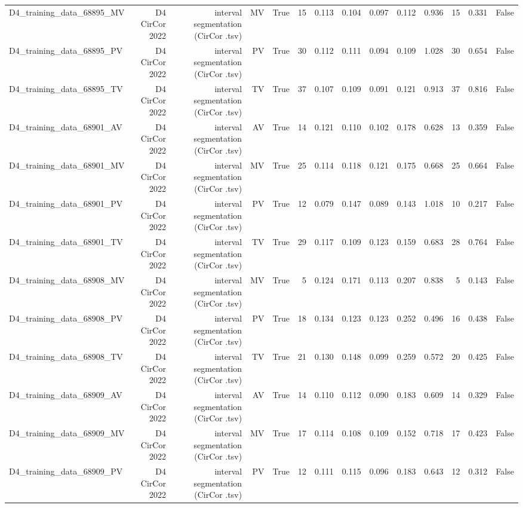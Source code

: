 \begin{table}[htbp]
\begin{tabular}{lrrrrrrrrrrrrr}
    D4\_training\_data\_68895\_MV & D4 CirCor 2022 & interval segmentation (CirCor .tsv) & MV & True & 15 & 0.113 & 0.104 & 0.097 & 0.112 & 0.936 & 15 & 0.331 & False \\
    D4\_training\_data\_68895\_PV & D4 CirCor 2022 & interval segmentation (CirCor .tsv) & PV & True & 30 & 0.112 & 0.111 & 0.094 & 0.109 & 1.028 & 30 & 0.654 & False \\
    D4\_training\_data\_68895\_TV & D4 CirCor 2022 & interval segmentation (CirCor .tsv) & TV & True & 37 & 0.107 & 0.109 & 0.091 & 0.121 & 0.913 & 37 & 0.816 & False \\
    D4\_training\_data\_68901\_AV & D4 CirCor 2022 & interval segmentation (CirCor .tsv) & AV & True & 14 & 0.121 & 0.110 & 0.102 & 0.178 & 0.628 & 13 & 0.359 & False \\
    D4\_training\_data\_68901\_MV & D4 CirCor 2022 & interval segmentation (CirCor .tsv) & MV & True & 25 & 0.114 & 0.118 & 0.121 & 0.175 & 0.668 & 25 & 0.664 & False \\
    D4\_training\_data\_68901\_PV & D4 CirCor 2022 & interval segmentation (CirCor .tsv) & PV & True & 12 & 0.079 & 0.147 & 0.089 & 0.143 & 1.018 & 10 & 0.217 & False \\
    D4\_training\_data\_68901\_TV & D4 CirCor 2022 & interval segmentation (CirCor .tsv) & TV & True & 29 & 0.117 & 0.109 & 0.123 & 0.159 & 0.683 & 28 & 0.764 & False \\
    D4\_training\_data\_68908\_MV & D4 CirCor 2022 & interval segmentation (CirCor .tsv) & MV & True & 5 & 0.124 & 0.171 & 0.113 & 0.207 & 0.838 & 5 & 0.143 & False \\
    D4\_training\_data\_68908\_PV & D4 CirCor 2022 & interval segmentation (CirCor .tsv) & PV & True & 18 & 0.134 & 0.123 & 0.123 & 0.252 & 0.496 & 16 & 0.438 & False \\
    D4\_training\_data\_68908\_TV & D4 CirCor 2022 & interval segmentation (CirCor .tsv) & TV & True & 21 & 0.130 & 0.148 & 0.099 & 0.259 & 0.572 & 20 & 0.425 & False \\
    D4\_training\_data\_68909\_AV & D4 CirCor 2022 & interval segmentation (CirCor .tsv) & AV & True & 14 & 0.110 & 0.112 & 0.090 & 0.183 & 0.609 & 14 & 0.329 & False \\
    D4\_training\_data\_68909\_MV & D4 CirCor 2022 & interval segmentation (CirCor .tsv) & MV & True & 17 & 0.114 & 0.108 & 0.109 & 0.152 & 0.718 & 17 & 0.423 & False \\
    D4\_training\_data\_68909\_PV & D4 CirCor 2022 & interval segmentation (CirCor .tsv) & PV & True & 12 & 0.111 & 0.115 & 0.096 & 0.183 & 0.643 & 12 & 0.312 & False \\

\end{tabular}
\end{table}
